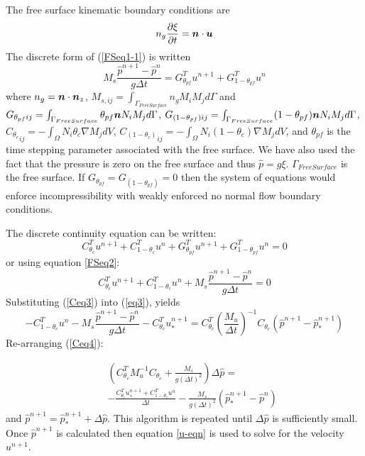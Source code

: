 \noindent The free surface kinematic boundary conditions are
\begin{equation}
 n_g\frac{\partial \xi}{\partial t} = {\mbox{\boldmath$n$}} \cdot {\mbox{\boldmath$u$}}
\label{FSeq1-1}
\end{equation}
\noindent The discrete form of (\ref{FSeq1-1}) is written
\begin{equation}
 M_s\frac{{\hat p}^{n+1}-{\hat p}^n}{g \Delta t} = 
G_{{\theta_{pf}}}^T u^{n+1}  +G_{{1-\theta_{pf}}}^T u^{n} 
\label{FSeq2}
\end{equation}
where $n_g={\mbox{\boldmath$n$}}\cdot {\mbox{\boldmath$n$}}_z$,  
$M_{s,ij}=\int_{\Gamma_{Free Surface}}n_gM_iM_j d \Gamma$ 
 and $G_{\theta_{pf} ij}=\int_{\Gamma_{Free Surface}}\theta_{pf} {\mbox{\boldmath$n$}}  N_iM_j d \Gamma $, 
 $G_{(1-\theta_{pf}) ij}=\int_{\Gamma_{Free Surface}}(1-\theta_{pf}) {\mbox{\boldmath$n$}}  N_iM_j d \Gamma $, 
 ${C_{\theta_c}}_{ij}=-\int_\Omega N_i \theta_c \nabla M_j d V$, 
 ${C_{(1-\theta_c)}}_{ij}=-\int_\Omega N_i (1-\theta_c) \nabla M_j d V$, 
 and $\theta_{pf}$ is the time stepping parameter associated with the free surface. We have 
 also used the fact that the pressure is zero on the free surface 
 and thus ${\hat p}=g\xi$. 
$\Gamma_{Free Surface}$ is the free surface. 
If $G_{\theta_{pf}}=G_{(1-\theta_{pf})}=0$ then the system 
of equations would enforce incompressibility with weakly enforced no normal flow 
boundary conditions. 

\noindent  
The discrete continuity equation can be written: 
\begin{equation}
C_{\theta_c}^T u^{n+1}+C_{1-\theta_c}^T u^{n}
 +G_{{\theta_{pf}}}^T u^{n+1}  +G_{{1-\theta_{pf}}}^T u^{n} =0
\label{Ceq2}
\end{equation}
or using equation \ref{FSeq2}: 
\begin{equation}
C_{\theta_c}^T u^{n+1}+C_{1-\theta_c}^T u^{n}
+M_s\frac{{\hat p}^{n+1}-{\hat p}^n}{g \Delta t}=0
\label{Ceq3}
\end{equation}
Substituting (\ref{Ceq3}) into (\ref{eq3}), yields       
\begin{equation}
-C_{1-\theta_c}^T u^{n}
-M_s\frac{{\hat p}^{n+1}-{\hat p}^n}{g \Delta t}-C_{\theta_c}^T u_*^{n+1}
=
C_{\theta_c}^T \left(\frac{M_u}{\Delta t}\right)^{-1}C_{\theta_c} 
({\hat p}^{n+1}-{\hat p}_*^{n+1})
\label{Ceq4}
\end{equation}
Re-arranging (\ref{Ceq4}): 

\begin{eqnarray}
&&\left(C_{\theta_c}^T 
M_u^{-1}C_{\theta_c}  
+ \frac{M_s}{g (\Delta t)^2}\right) \Delta {\hat p} =  \nonumber\\ 
&& -\frac{
C_{\theta_c}^T u^{n+1}_*+C_{1-\theta_c}^T u^{n}
}{\Delta t}
-\frac{M_s}{g (\Delta t)^2}({\hat p}_*^{n+1}-{\hat p}^{n})
\label{Ceq5}
\end{eqnarray}
and ${\hat p}^{n+1}={\hat p}_*^{n+1}+\Delta {\hat p}$. This algorithm 
is repeated until $\Delta {\hat p}$ is sufficiently small. 
Once ${\hat p}^{n+1}$ is calculated then equation \ref{u-eqn} 
is used to solve for the velocity $u^{n+1}$.



